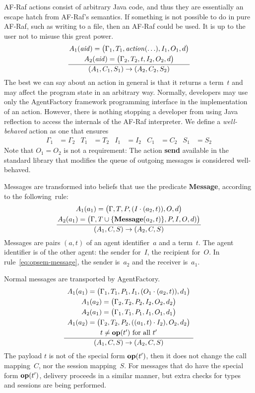 \documentclass[a4paper,12pt,oneside,fleqn]{book} %
\newcommand{\on}[2]{\genfrac{}{}{0pt}{0}{\strut#1}{\strut#2}}
\begin{document}
AF-Raf actions consist of arbitrary Java code, and thus they are
essentially an escape hatch from AF-Raf's semantics. If something is not
possible to do in pure AF-Raf, such as writing to a file, then an AF-Raf
could be used. It is up to the user not to misuse this great power.
\begin{align}
\frac
  {\on{A_1({\it aid})=\bigl(\Gamma_1,T_1,{\it action}(\ldots),I_1,O_1,d\bigr)}
      {A_2({\it aid})=\bigl(\Gamma_2,T_2,t,I_2,O_2,d\bigr)}}
  {(A_1,C_1,S_1)\to(A_2,C_2,S_2)}
\end{align}
The best we can say about an action in general is that it returns a
term~$t$ and may affect the program state in an arbitrary way. Normally,
developers may use only the AgentFactory framework programming interface in
the implementation of an action. However, there is nothing stopping a
developer from using Java reflection to access the internals of the AF-Raf
interpreter.  We define a \emph{well-behaved} action as one that ensures
\begin{align}
\Gamma_1&=\Gamma_2  & T_1&=T_2 & I_1&=I_2 & C_1 &=C_2 & S_1&=S_2
\end{align}
Note that $O_1=O_2$ is not a requirement: The action {\bf send} available
in the standard library that modifies the queue of outgoing messages is
considered well-behaved.

Messages are transformed into beliefs that use the predicate {\bf Message},
according to the following~rule:
\begin{align}
\frac
  {\on{A_1(a_1)=\bigl(\Gamma,T,P,(I\cdot(a_2,t)),O,d\bigr)}
      {A_2(a_1)=\bigl(\Gamma,T\cup\{{\bf Message}(a_2,t)\},P,I,O,d)\bigr)}}
  {(A_1,C,S)\to(A_2,C,S)}
  \label{eq:opsem-message}
\end{align}
Messages are pairs $(a,t)$ of an agent identifier~$a$ and a term~$t$. The
agent identifier is of the other agent: the sender for~$I$, the recipient
for~$O$. In rule~\eqref{eq:opsem-message}, the sender is~$a_2$ and the
receiver is~$a_1$.

Normal messages are transported by AgentFactory.
\begin{align}
\frac
  {\on{A_1(a_1)=\bigl(\Gamma_1,T_1,P_1,I_1,(O_1\cdot(a_2,t)),d_1\bigr)}
  {\on{A_1(a_2)=\bigl(\Gamma_2,T_2,P_2,I_2,O_2,d_2\bigr)}
  {\on{A_2(a_1)=\bigl(\Gamma_1,T_1,P_1,I_1,O_1,d_1\bigr)}
  {\on{A_1(a_2)=\bigl(\Gamma_2,T_2,P_2,((a_1,t)\cdot I_2),O_2,d_2\bigr)}
      {\text{$t\ne{\bf op}(t')$ for all $t'$}}}}}}
  {(A_1,C,S)\to(A_2,C,S)}
  \label{eq:opsem-msg-nonop}
\end{align}
The payload $t$ is not of the special form ${\bf op}(t')$, then it does not
change the call mapping~$C$, nor the session mapping~$S$. For messages that
do have the special form ${\bf op}(t')$, delivery proceeds in a similar
manner, but extra checks for types and sessions are being performed.
\end{document}
